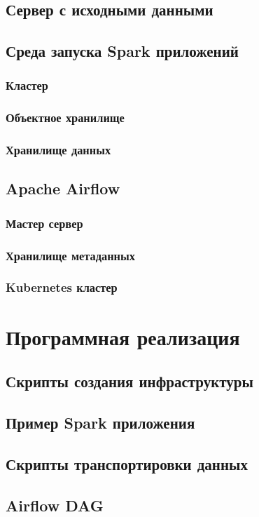 \documentclass[bachelor, och, pract]{SCWorks}
\begin{document}
\subsection{Сервер с исходными данными}
\subsection{Среда запуска Spark приложений}
\subsubsection{Кластер}
\subsubsection{Объектное хранилище}
\subsubsection{Хранилище данных}
\subsection{Apache Airflow}
\subsubsection{Мастер сервер}
\subsubsection{Хранилище метаданных}
\subsubsection{Kubernetes кластер}

\section{Программная реализация}
\subsection{Скрипты создания инфраструктуры}
\subsection{Пример Spark приложения}
\subsection{Скрипты транспортировки данных}
\subsection{Airflow DAG}
\end{document}
